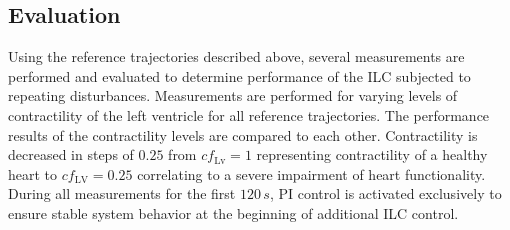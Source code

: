 %


\subsection{Evaluation}
Using the reference trajectories described above, several measurements are performed and evaluated to determine performance of the ILC subjected to repeating disturbances. Measurements are performed for varying levels of contractility of the left ventricle for all reference trajectories. The performance results of the contractility levels are compared to each other. Contractility is decreased in steps of $0.25$ from $cf_{\mathrm{Lv}}=1$ representing contractility of a healthy heart to $cf_{\mathrm{LV}}=0.25$ correlating to a severe impairment of heart functionality.
\\During all measurements for the first $120\,s$, PI control is activated exclusively to ensure stable system behavior at the beginning of additional ILC control.

